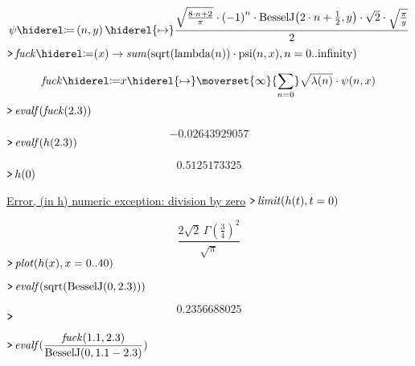 \documentclass{article}
\begin{document}
\begin{dmath}\label{(5)}
\psi \coloneqq \left(n ,y \right)\hiderel{\mapsto }\frac{\sqrt{\frac{8\cdot n +2}{\pi}}\cdot \left(-1\right)^{n}\cdot \mathrm{BesselJ}\! \left(2\cdot n +\frac{1}{2},y \right)\cdot \sqrt{2}\cdot \sqrt{\frac{\pi}{y}}}{2}
\end{dmath}
\mapleinput
{$ \displaystyle \texttt{>\,} \mathit{fuck} \coloneqq (x)\rightarrow \mathit{sum} (\mathrm{sqrt}(\mathrm{lambda}(n))\cdot \mathrm{psi}(n ,x),n =0..\mathrm{infinity}) $}

\begin{dmath}\label{(6)}
\mathit{fuck} \coloneqq x \hiderel{\mapsto }\moverset{\infty}{\munderset{n =0}{\sum}}\sqrt{\lambda \! \left(n \right)}\cdot \psi \! \left(n ,x \right)
\end{dmath}
\mapleinput
{$ \displaystyle \texttt{>\,} \mathit{evalf} (\mathit{fuck} ( 2.3)) $}

\begin{dmath}\label{(7)}
- 0.02643929057
\end{dmath}
\mapleinput
{$ \displaystyle \texttt{>\,} \mathit{evalf} (h ( 2.3)) $}

\begin{dmath}\label{(8)}
 0.5125173325
\end{dmath}
\mapleinput
{$ \displaystyle \texttt{>\,} h (0) $}

\href{http://www.maplesoft.com/support/help/errors/view.aspx?path=Error,%20(in%20h)%20numeric%20exception%3A%20division%20by%20zero}{Error, (in h) numeric exception: division by zero}\mapleinput
{$ \displaystyle \texttt{>\,} \mathit{limit} (h (t),t =0) $}

\begin{dmath}\label{(9)}
\frac{2 \sqrt{2}\, \Gamma \! \left(\frac{3}{4}\right)^{2}}{\sqrt{\pi}}
\end{dmath}
\mapleinput
{$ \displaystyle \texttt{>\,} \mathit{plot} (h (x),x =0..40) $}

\mapleinput
{$ \displaystyle \texttt{>\,} \mathit{evalf} (\mathrm{sqrt}(\mathrm{BesselJ}(0, 2.3))) $}

\begin{dmath}\label{(10)}
 0.2356688025
\end{dmath}
\mapleinput
{$ \displaystyle \texttt{>\,} \, $}

\mapleinput
{$ \displaystyle \texttt{>\,} \mathit{evalf} (\frac{\mathit{fuck} ( 1.1, 2.3)}{\mathrm{BesselJ}(0, 1.1- 2.3)}) $}
\end{document}
